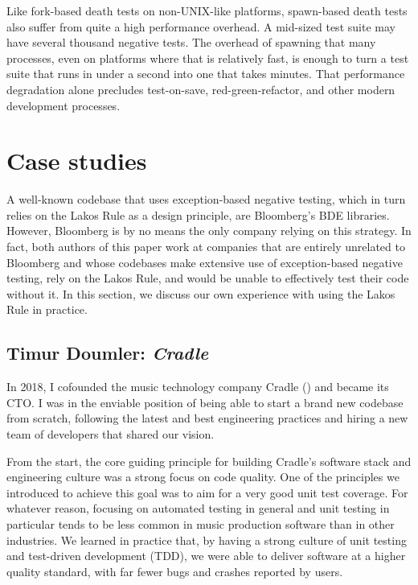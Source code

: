 Like fork-based death tests on non-UNIX-like platforms, spawn-based death tests also suffer from quite a high performance overhead. A mid-sized test suite may have several thousand negative tests. The overhead of spawning that many processes, even on platforms where that is relatively fast, is enough to turn a test suite that runs in under a second into one that takes minutes. That performance degradation alone precludes test-on-save, red-green-refactor, and other modern development processes.

\section{Case studies}
\label{sec:casestudies}

A well-known codebase that uses exception-based negative testing, which in turn relies on the Lakos Rule as a design principle, are Bloomberg's BDE libraries. However, Bloomberg is by no means the only company relying on this strategy. In fact, both authors of this paper work at companies that are entirely unrelated to Bloomberg and whose codebases make extensive use of exception-based negative testing, rely on the Lakos Rule, and would be unable to effectively test their code without it. In this section, we discuss our own experience with using the Lakos Rule in practice.

\subsection{Timur Doumler: \emph{Cradle}}

In 2018, I cofounded the music technology company Cradle (\hyperref[https://cradle.app]{}) and became its CTO. I was in the enviable position of being able to start a brand new codebase from scratch, following the latest and best engineering practices and hiring a new team of developers that shared our vision.

From the start, the core guiding principle for building Cradle's software stack and engineering culture was a strong focus on code quality. One of the principles we introduced to achieve this goal was to aim for a very good unit test coverage. For whatever reason, focusing on automated testing in general and unit testing in particular tends to be less common in  music production software than in other industries. We learned in practice that, by having a strong culture of unit testing and test-driven development (TDD), we were able to deliver software at a higher quality standard, with far fewer bugs and crashes reported by users.

